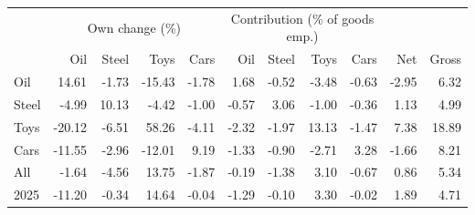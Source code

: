 \begin{tabular}{lrrrrrrrrrr}
\toprule
 & \multicolumn{4}{c}{Own change (\%)} & \multicolumn{4}{c}{Contribution (\% of goods emp.)} & & \\
\cmidrule(lr){2-5}\cmidrule(lr){6-9}
 & Oil & Steel & Toys & Cars & Oil & Steel & Toys & Cars & Net & Gross \\
\midrule
Oil & 14.61 & -1.73 & -15.43 & -1.78 & 1.68 & -0.52 & -3.48 & -0.63 & -2.95 & 6.32 \\
Steel & -4.99 & 10.13 & -4.42 & -1.00 & -0.57 & 3.06 & -1.00 & -0.36 & 1.13 & 4.99 \\
Toys & -20.12 & -6.51 & 58.26 & -4.11 & -2.32 & -1.97 & 13.13 & -1.47 & 7.38 & 18.89 \\
Cars & -11.55 & -2.96 & -12.01 & 9.19 & -1.33 & -0.90 & -2.71 & 3.28 & -1.66 & 8.21 \\
All & -1.64 & -4.56 & 13.75 & -1.87 & -0.19 & -1.38 & 3.10 & -0.67 & 0.86 & 5.34 \\
2025 & -11.20 & -0.34 & 14.64 & -0.04 & -1.29 & -0.10 & 3.30 & -0.02 & 1.89 & 4.71 \\
\bottomrule
\end{tabular}
